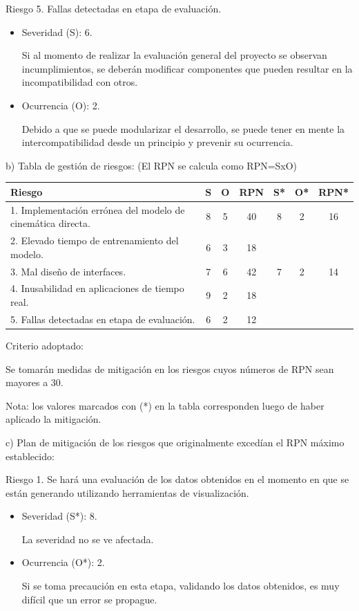 \documentclass[
11pt, %
]{charter}
\begin{document}
Riesgo 5. Fallas detectadas en etapa de evaluación.
\begin{itemize}
	\item Severidad (S): 6.
	
	Si al momento de realizar la evaluación general del proyecto se observan incumplimientos, se deberán modificar componentes que pueden resultar en la incompatibilidad con otros.
	\item Ocurrencia (O): 2.
	
	Debido a que se puede modularizar el desarrollo, se puede tener en mente la intercompatibilidad desde un principio y prevenir su ocurrencia.
\end{itemize}


b) Tabla de gestión de riesgos:      (El RPN se calcula como RPN=SxO)

\begin{table}[htpb]
\centering
\begin{tabularx}{\linewidth}{@{}|X|c|c|c|c|c|c|@{}}
\hline
\rowcolor[HTML]{C0C0C0} 
Riesgo & S & O & RPN & S* & O* & RPN* \\ \hline
  1. Implementación errónea del modelo de cinemática directa.     & 8  & 5  & 40    & 8   & 2   & 16     \\ \hline
   2. Elevado tiempo de entrenamiento del modelo.    & 6  & 3  & 18    &    &    &      \\ \hline
    3. Mal diseño de interfaces.   & 7  & 6  & 42    & 7   & 2   & 14     \\ \hline
     4. Inusabilidad en aplicaciones de tiempo real.  & 9  & 2  & 18    &    &    &      \\ \hline
      5. Fallas detectadas en etapa de evaluación. & 6  & 2  & 12    &    &    &      \\ \hline
\end{tabularx}%
\end{table}

Criterio adoptado: 

Se tomarán medidas de mitigación en los riesgos cuyos números de RPN sean mayores a 30.

Nota: los valores marcados con (*) en la tabla corresponden luego de haber aplicado la mitigación.

c) Plan de mitigación de los riesgos que originalmente excedían el RPN máximo establecido:
 
Riesgo 1. Se hará una evaluación de los datos obtenidos en el momento en que se están generando utilizando herramientas de visualización.
  \begin{itemize}
	\item Severidad (S*): 8.
	
	La severidad no se ve afectada.
	\item Ocurrencia (O*): 2.
	
	Si se toma precaución en esta etapa, validando los datos obtenidos, es muy difícil que un error se propague.
	\end{itemize}
\end{document}
